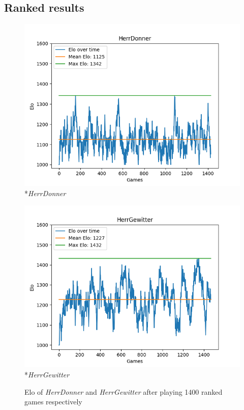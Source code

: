 \subsection{Ranked results}
\begin{figure}[h]
  \centering
  \begin{minipage}{.5\textwidth}
    \centering
    \includegraphics[width=1\linewidth]{images/Donner-Elo-Time.png}
    *{\textit{HerrDonner}}
  \end{minipage}%
  \begin{minipage}{.5\textwidth}
    \centering
    \includegraphics[width=1\linewidth]{images/Gewitter-Elo-Time.png}
    *{\textit{HerrGewitter}}
  \end{minipage}
  \captionsetup{justification=centering,margin=1cm}
  \caption{Elo of \textit{HerrDonner} and \textit{HerrGewitter} after playing 1400 ranked games respectively}
  \label{fig:donner-gewitter-elo}
\end{figure}
